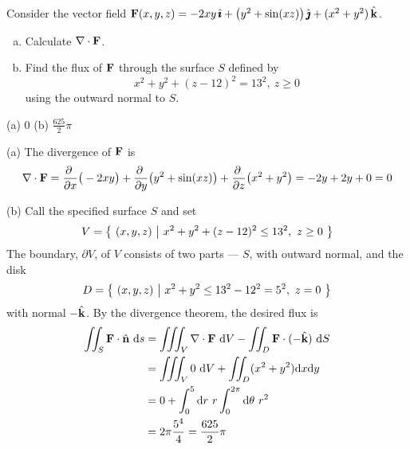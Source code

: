 \begin{question}[M317 2004A] %
Consider the vector field $\mathbf{F}(x,y,z)
=-2xy\,\hat{\pmb{\imath}}+\big(y^2+\sin(xz)\big)\,\hat{\pmb{\jmath}}+(x^2+y^2)\,\hat{\mathbf{k}}$.
\begin{enumerate}[(a)]
\item 
Calculate $\nabla\cdot \mathbf{F}$. 
\item
Find the flux of $\mathbf{F}$ through the surface $S$ defined by
\begin{equation*}
x^2+y^2+(z-12)^2=13^2,\ z\ge 0
\end{equation*}
using the outward normal to $S$.
\end{enumerate}
\end{question}


\begin{answer} 
(a) $0$\qquad
(b) $\frac {625}{2}\pi$
\end{answer}

\begin{solution} 
(a) The divergence of $\mathbf{F}$ is
\begin{equation*}
\nabla\cdot \vF
=\pdiff{}{x}\big(-2xy\big)
+\pdiff{}{y}\big(y^2+\sin(xz)\big)
+\pdiff{}{z}\big(x^2+y^2\big)
=-2y+2y+0=0
\end{equation*}

(b)
Call the specified surface $S$ and set
\begin{equation*}
V = \big\{ \ (x,y,z)\ \big|\ x^2+y^2+(z-12)^2\le 13^2,\ z\ge 0\ \big\}
\end{equation*}
The boundary, $\partial V$, of $V$ consists of two parts ---
$S$, with outward normal, and the disk
\begin{equation*}
D = \big\{ \ (x,y,z)\ \big|\ x^2+y^2\le 13^2-12^2=5^2,\ z=0\ \big\}
\end{equation*}
with normal $-\hat{\mathbf{k}}$.
By the divergence theorem, the desired flux is
\begin{align*}
\dblInt_S\vF\cdot\hn\ \dee{s}
&=\tripInt_V\nabla\cdot \vF\ \dee{V} - \dblInt_D \vF\cdot(-\hk)\ \dee{S}\\
&=\tripInt_V 0 \ \dee{V} + \dblInt_D (x^2+y^2) \dee{x}\dee{y} \\
&=0 +\int_0^5\dee{r}\ r\int_0^{2\pi}\dee{\theta}\ r^2 \\
&=2\pi\frac{5^4}{4} = \frac {625}{2}\pi
\end{align*}
\end{solution}

